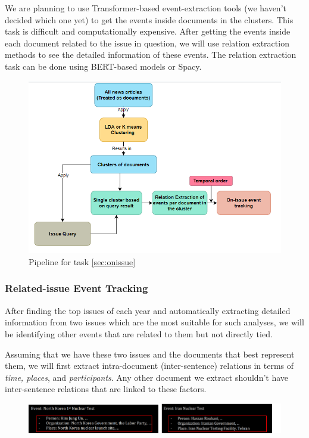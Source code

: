 \documentclass[sigconf,authorversion,nonacm]{acmart}
\begin{document}
We are planning to use Transformer-based event-extraction tools (we haven’t decided which one yet) to get the events inside documents in the clusters. This task is difficult and computationally expensive. After getting the events inside each document related to the issue in question, we will use relation extraction methods to see the detailed information of these events. The relation extraction task can be done using BERT-based models or Spacy.

\begin{figure}[h]
    \centering
    \includegraphics[width=\linewidth]{img/2-1pipeline.png}
    \caption{Pipeline for task \ref{sec:onissue}}
\end{figure}


\subsubsection{Related-issue Event Tracking}
After finding the top issues of each year and automatically extracting detailed information from two issues which are the most suitable for such analyses, we will be identifying other events that are related to them but not directly tied.

Assuming that we have these two issues and the documents that best represent them, we will first extract intra-document (inter-sentence) relations in terms of \emph{time, places}, and \emph{participants}. Any other document we extract shouldn’t have inter-sentence relations that are linked to these factors.
\begin{figure}[h]
    \centering
    \includegraphics[width=\linewidth]{img/2-2.png}
\end{figure}
\end{document}
